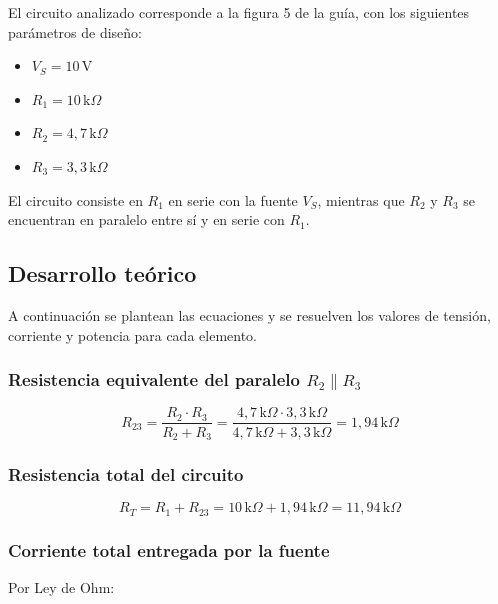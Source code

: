 \documentclass[12pt,a4paper]{article}
\begin{document}
El circuito analizado corresponde a la figura 5 de la guía, con los siguientes
parámetros de diseño:
 
\begin{itemize}
    \item $V_S = 10\,\text{V}$
    \item $R_1 = 10\,\text{k}\Omega$
    \item $R_2 = 4{,}7\,\text{k}\Omega$
    \item $R_3 = 3{,}3\,\text{k}\Omega$
\end{itemize}
 
El circuito consiste en $R_1$ en serie con la fuente $V_S$, mientras que $R_2$
y $R_3$ se encuentran en paralelo entre sí y en serie con $R_1$.
 
\subsection{Desarrollo teórico}
 
A continuación se plantean las ecuaciones y se resuelven los valores de tensión,
corriente y potencia para cada elemento.
 
\subsubsection{Resistencia equivalente del paralelo $R_2 \| R_3$}
 
\begin{equation}
    R_{23} = \frac{R_2 \cdot R_3}{R_2 + R_3}
    = \frac{4{,}7\,\text{k}\Omega \cdot 3{,}3\,\text{k}\Omega}
           {4{,}7\,\text{k}\Omega + 3{,}3\,\text{k}\Omega}
    = {1{,}94}\,\text{k}\Omega
\end{equation}
 
\subsubsection{Resistencia total del circuito}
 
\begin{equation}
    R_T = R_1 + R_{23}
    = 10\,\text{k}\Omega + {1{,}94}\,\text{k}\Omega
    = {11{,}94}\,\text{k}\Omega
\end{equation}
 
\subsubsection{Corriente total entregada por la fuente}
 
Por Ley de Ohm:
 
\end{document}
